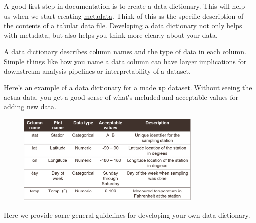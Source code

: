\documentclass[
  letterpaper,
  DIV=11,
  numbers=noendperiod]{scrreprt}
\begin{document}
A good first step in documentation is to create a data dictionary. This
will help us when we start creating
\protect\hyperlink{importance-of-metadata}{metadata}. Think of this as
the specific description of the contents of a tabular data file.
Developing a data dictionary not only helps with metadata, but also
helps you think more clearly about your data.

A data dictionary describes column names and the type of data in each
column. Simple things like how you name a data column can have larger
implications for downstream analysis pipelines or interpretability of a
dataset.

Here's an example of a data dictionary for a made up dataset. Without
seeing the actua data, you get a good sense of what's included and
acceptable values for adding new data.

\begin{figure}

{\centering \includegraphics[width=0.8\textwidth,height=\textheight]{./img/datadict.png}

}

\end{figure}

Here we provide some general guidelines for developing your own data
dictionary.
\end{document}
